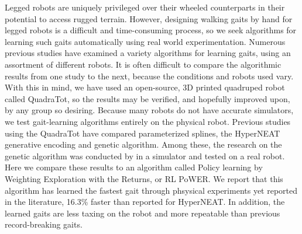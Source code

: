 %

Legged robots are uniquely privileged over their wheeled counterparts
in their potential to access rugged terrain. However, designing
walking gaits by hand for legged robots is a difficult and
time-consuming process, so we seek algorithms for learning such gaits
automatically using real world experimentation. Numerous previous
studies have examined a variety algorithms for learning gaits, using
an assortment of different robots. It is often difficult to compare
the algorithmic results from one study to the next, because the
conditions and robots used vary. With this in mind, we have used an
open-source, 3D printed quadruped robot called QuadraTot, so the results may be
verified, and hopefully improved upon, by any group so
desiring. Because many robots do not have accurate simulators, we test
gait-learning algorithms entirely on the physical robot. Previous
studies using the QuadraTot have compared parameterized splines, the
HyperNEAT generative encoding and genetic algorithm. Among these, the research on the genetic algorithm was conducted by \citep{glette2012evolution-of-locomotion-in-a-simulated} in a simulator and tested on a real robot. Here we
compare these results to an algorithm called Policy learning by
Weighting Exploration with the Returns, or RL PoWER. We report that
this algorithm has learned the fastest gait through phsysical experiments yet reported in the
literature, 16.3\% faster than reported for HyperNEAT. In addition, the learned gaits are less taxing
on the robot and more repeatable than previous record-breaking gaits. 
